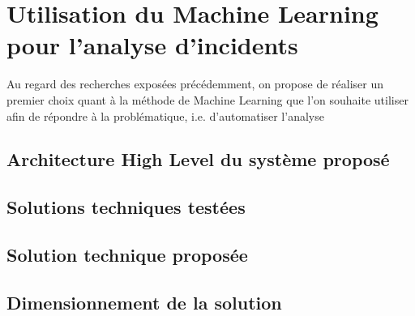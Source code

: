 \chapter{Utilisation du Machine Learning pour l'analyse d'incidents}
\label{Utilisation du Machine Learning pour l'analyse d'incidents}
\thispagestyle{fancy}

Au regard des recherches exposées précédemment, on propose de réaliser un premier choix quant à la méthode de Machine Learning que l'on souhaite utiliser afin de répondre à la problématique, i.e. d'automatiser l'analyse 

\section{Architecture High Level du système proposé}
\label{Utilisation du Machine Learning pour l'analyse d'incidents: Achitecture High Level du système proposé}

\section{Solutions techniques testées}
\label{Utilisation du Machine Learning pour l'analyse d'incidents: Solutions techniques testées}

\section{Solution technique proposée}
\label{Utilisation du Machine Learning pour l'analyse d'incidents: Solution technique proposée}

\section{Dimensionnement de la solution}
\label{Utilisation du Machine Learning pour l'analyse d'incidents: Dimensionnement de la solution}